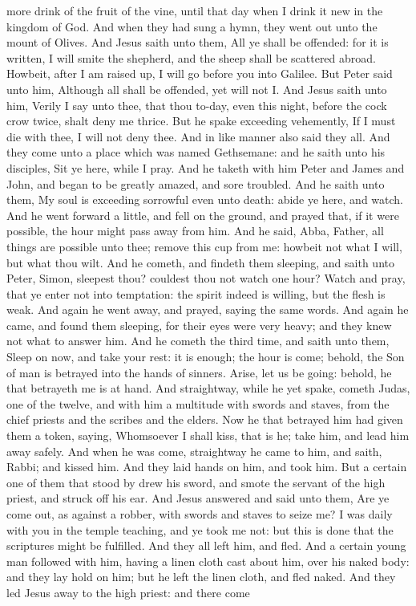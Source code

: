 more drink of the fruit of the vine, until that day when I drink it new in the kingdom of God.  And when they had sung a hymn, they went out unto the mount of Olives.  And Jesus saith unto them, All ye shall be offended: for it is written, I will smite the shepherd, and the sheep shall be scattered abroad. Howbeit, after I am raised up, I will go before you into Galilee. But Peter said unto him, Although all shall be offended, yet will not I. And Jesus saith unto him, Verily I say unto thee, that thou to-day, even this night, before the cock crow twice, shalt deny me thrice. But he spake exceeding vehemently, If I must die with thee, I will not deny thee. And in like manner also said they all.  And they come unto a place which was named Gethsemane: and he saith unto his disciples, Sit ye here, while I pray. And he taketh with him Peter and James and John, and began to be greatly amazed, and sore troubled. And he saith unto them, My soul is exceeding sorrowful even unto death: abide ye here, and watch. And he went forward a little, and fell on the ground, and prayed that, if it were possible, the hour might pass away from him. And he said, Abba, Father, all things are possible unto thee; remove this cup from me: howbeit not what I will, but what thou wilt. And he cometh, and findeth them sleeping, and saith unto Peter, Simon, sleepest thou? couldest thou not watch one hour? Watch and pray, that ye enter not into temptation: the spirit indeed is willing, but the flesh is weak. And again he went away, and prayed, saying the same words. And again he came, and found them sleeping, for their eyes were very heavy; and they knew not what to answer him. And he cometh the third time, and saith unto them, Sleep on now, and take your rest: it is enough; the hour is come; behold, the Son of man is betrayed into the hands of sinners. Arise, let us be going: behold, he that betrayeth me is at hand.  And straightway, while he yet spake, cometh Judas, one of the twelve, and with him a multitude with swords and staves, from the chief priests and the scribes and the elders. Now he that betrayed him had given them a token, saying, Whomsoever I shall kiss, that is he; take him, and lead him away safely. And when he was come, straightway he came to him, and saith, Rabbi; and kissed him. And they laid hands on him, and took him. But a certain one of them that stood by drew his sword, and smote the servant of the high priest, and struck off his ear. And Jesus answered and said unto them, Are ye come out, as against a robber, with swords and staves to seize me? I was daily with you in the temple teaching, and ye took me not: but this is done that the scriptures might be fulfilled. And they all left him, and fled.  And a certain young man followed with him, having a linen cloth cast about him, over his naked body: and they lay hold on him; but he left the linen cloth, and fled naked.  And they led Jesus away to the high priest: and there come 